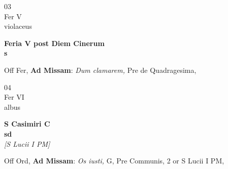 \documentclass[10pt, openany]{book}
\begin{document}
        \begin{center}
            \begin{minipage}{3.5in}
                \vspace{2em}
                \begin{minipage}{0.5in}
                    {\Huge 03} \\
                    {\normalsize Fer V} \\
                    {\normalsize violaceus}
                \end{minipage}
                \begin{minipage}{3.0in}
                    \textbf{ \large Feria V post Diem Cinerum \\
                    \textnormal{\normalsize s}} \\ 
                \end{minipage}
                \begin{justify}Off Fer, \textbf{Ad Missam}: \textit{Dum clamarem,} Pre de Quadragesima,   
                \end{justify}
            \end{minipage}
        \end{center}
    
        \begin{center}
            \begin{minipage}{3.5in}
                \vspace{2em}
                \begin{minipage}{0.5in}
                    {\Huge 04} \\
                    {\normalsize Fer VI} \\
                    {\normalsize albus}
                \end{minipage}
                \begin{minipage}{3.0in}
                    \textbf{ \large S Casimiri C \\
                    \textnormal{\normalsize sd}} \\ \textit{[S Lucii I PM]} \\ 
                \end{minipage}
                \begin{justify}Off Ord, \textbf{Ad Missam}: \textit{Os iusti,} G, Pre Communis, 2 or S Lucii I PM,   
                \end{justify}
            \end{minipage}
        \end{center}
    
\end{document}
